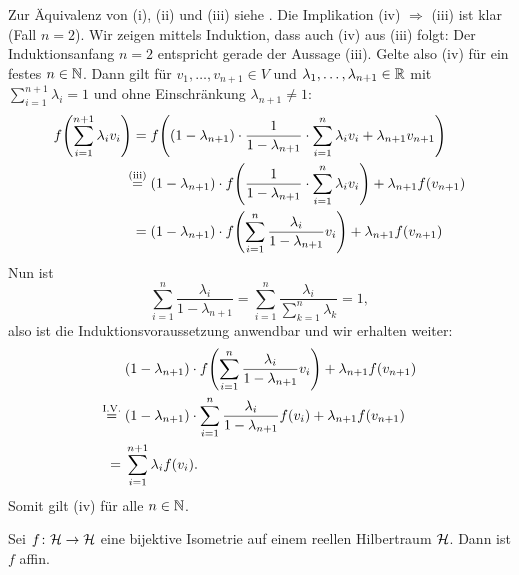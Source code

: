 \begin{beweis}
	Zur Äquivalenz von (i), (ii) und (iii) siehe  \cite{Jussi}. Die Implikation (iv) $\Rightarrow$ (iii) ist klar (Fall $n=2$). Wir zeigen mittels Induktion, dass auch (iv) aus (iii) folgt: Der Induktionsanfang $n=2$ entspricht gerade der Aussage (iii). Gelte also (iv) für ein festes $n \in \mathbb{N}$. Dann gilt für $v_1, \dots, v_{n+1} \in V$ und $\lambda_1, \dots, \lambda_{n+1} \in \mathbb{R}$ mit $\sum_{i=1}^{n+1} \lambda_i = 1$ und ohne Einschränkung $\lambda_{n+1} \neq 1$:
	\begin{equation}
	\begin{aligned}
		f \enbrace*{\sum\limits_{i=1}^{n+1} \lambda_i v_i} = \; &f\enbrace*{ (1-\lambda_{n+1}) \cdot \frac{1}{1-\lambda_{n+1}} \cdot \sum\limits_{i=1}^{n} \lambda_i v_i + \lambda_{n+1} v_{n+1}} \\
		\overset{\text{(iii)}}{=} \; &(1-\lambda_{n+1}) \cdot f \enbrace*{\frac{1}{1-\lambda_{n+1}} \cdot \sum\limits_{i=1}^{n} \lambda_i v_i} + \lambda_{n+1} f(v_{n+1}) \\
		= \; &(1-\lambda_{n+1}) \cdot f\enbrace*{\sum\limits_{i=1}^{n} \frac{\lambda_i}{1-\lambda_{n+1}} v_i} + \lambda_{n+1} f(v_{n+1})
	\end{aligned}
	\end{equation}
	Nun ist
	\[
		\sum\limits_{i=1}^{n} \frac{\lambda_i}{1-\lambda_{n+1}} = \sum\limits_{i=1}^{n} \frac{\lambda_i}{\sum\limits_{k=1}^{n} \lambda_k} = 1,
	\]
	also ist die Induktionsvoraussetzung anwendbar und wir erhalten weiter:
	\begin{equation}
	\begin{aligned}
		&(1-\lambda_{n+1}) \cdot f\enbrace*{\sum\limits_{i=1}^{n} \frac{\lambda_i}{1-\lambda_{n+1}} v_i} + \lambda_{n+1} f(v_{n+1}) \\
		\overset{\text{I.V.}}{=} \; &(1-\lambda_{n+1}) \cdot \sum\limits_{i=1}^{n} \frac{\lambda_i}{1-\lambda_{n+1}} f(v_i) + \lambda_{n+1} f(v_{n+1}) \\
		= \; &\sum\limits_{i=1}^{n+1} \lambda_i f(v_i).
	\end{aligned}
	\end{equation}
	Somit gilt (iv) für alle $n \in \mathbb{N}$. \qedhere
	
\end{beweis}

\begin{satz}
\label{satz_mazur-ulam}
	Sei $f\colon \mathcal{H} \rightarrow \mathcal{H}$ eine bijektive Isometrie auf einem reellen Hilbertraum $\mathcal{H}$. Dann ist $f$ affin.
\end{satz}

